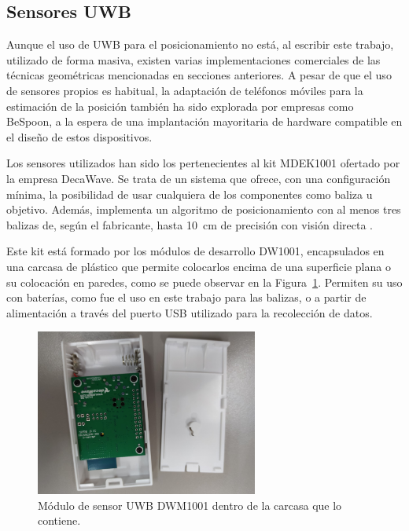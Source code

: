 \subsection{Sensores UWB}

Aunque el uso de UWB para el posicionamiento no está, al escribir este trabajo, utilizado de forma masiva, existen varias implementaciones comerciales de las técnicas geométricas mencionadas en secciones anteriores.
A pesar de que el uso de sensores propios es habitual, la adaptación de teléfonos móviles para la estimación de la posición también ha sido explorada por empresas como BeSpoon, a la espera de una implantación mayoritaria de hardware compatible en el diseño de estos dispositivos.

Los sensores utilizados han sido los pertenecientes al kit MDEK1001 ofertado por la empresa DecaWave.
Se trata de un sistema que ofrece, con una configuración mínima, la posibilidad de usar cualquiera de los componentes como baliza u objetivo.
Además, implementa un algoritmo de posicionamiento con al menos tres balizas de, según el fabricante, hasta 10~cm de precisión con visión directa \cite{Decawave}.

Este kit está formado por los módulos de desarrollo DW1001, encapsulados en una carcasa de plástico que permite colocarlos encima de una superficie plana o su colocación en paredes, como se puede observar en la Figura~\ref{fig:sensor_UWB}.
Permiten su uso con baterías, como fue el uso en este trabajo para las balizas, o a partir de alimentación a través del puerto USB utilizado para la recolección de datos.

\begin{figure}[H]
    \centering
    \includegraphics[width=0.65\textwidth]{pic/sensor_abierto.jpg}
    \caption{Módulo de sensor UWB DWM1001 dentro de la carcasa que lo contiene.}
    \label{fig:sensor_UWB}
\end{figure}

